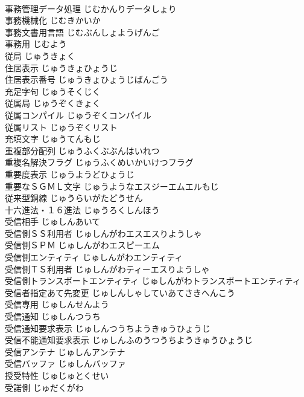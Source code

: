 \documentclass[8pt]{extreport}
\begin{document}
\begin{CJK}{UTF8}{min}
\\	事務管理データ処理	じむかんりデータしょり	
\\	事務機械化	じむきかいか	
\\	事務文書用言語	じむぶんしょようげんご	
\\	事務用	じむよう	
\\	従局	じゅうきょく	
\\	住居表示	じゅうきょひょうじ	
\\	住居表示番号	じゅうきょひょうじばんごう	
\\	充足字句	じゅうそくじく	
\\	従属局	じゅうぞくきょく	
\\	従属コンパイル	じゅうぞくコンパイル	
\\	従属リスト	じゅうぞくリスト	
\\	充填文字	じゅうてんもじ	
\\	重複部分配列	じゅうふくぶぶんはいれつ	
\\	重複名解決フラグ	じゅうふくめいかいけつフラグ	
\\	重要度表示	じゅうようどひょうじ	
\\	重要なＳＧＭＬ文字	じゅうようなエスジーエムエルもじ	
\\	従来型銅線	じゅうらいがたどうせん	
\\	十六進法・１６進法	じゅうろくしんほう	
\\	受信相手	じゅしんあいて	
\\	受信側ＳＳ利用者	じゅしんがわエスエスりようしゃ	
\\	受信側ＳＰＭ	じゅしんがわエスピーエム	
\\	受信側エンティティ	じゅしんがわエンティティ	
\\	受信側ＴＳ利用者	じゅしんがわティーエスりようしゃ	
\\	受信側トランスポートエンティティ	じゅしんがわトランスポートエンティティ	
\\	受信者指定あて先変更	じゅしんしゃしていあてさきへんこう	
\\	受信専用	じゅしんせんよう	
\\	受信通知	じゅしんつうち	
\\	受信通知要求表示	じゅしんつうちようきゅうひょうじ	
\\	受信不能通知要求表示	じゅしんふのうつうちようきゅうひょうじ	
\\	受信アンテナ	じゅしんアンテナ	
\\	受信バッファ	じゅしんバッファ	
\\	授受特性	じゅじゅとくせい	
\\	受諾側	じゅだくがわ	

\end{CJK}
\end{document}
